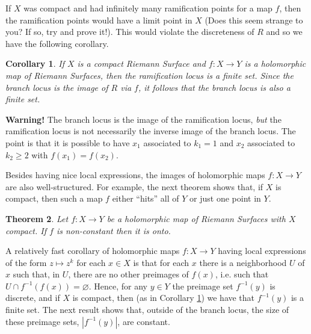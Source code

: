 \documentclass[12pt]{book}%
\theoremstyle{plain}
\newtheorem{theorem}{Theorem}[section]
\newtheorem{corollary}[theorem]{Corollary}
\theoremstyle{definition}
\theoremstyle{remark}
\def\to{\rightarrow}
\begin{document}
If $X$ was compact and had infinitely many ramification points for a map $f$, then the ramification points would have a limit point in $X$ (Does this seem strange to you? If so, try and prove it!). This would violate the discreteness of $R$ and so we have the following corollary. 
 
\begin{corollary}
\label{finiteRamification}
If $X$ is a compact Riemann Surface and $f:X \to Y$ is a holomorphic map of Riemann Surfaces, then the ramification locus is a finite set. Since the branch locus is the image of $R$ via $f$, it follows that the branch locus is also a finite set.
\end{corollary}

\noindent\textbf{Warning!} The branch locus is the image of the ramification locus, \textit{but} the ramification locus is not necessarily the inverse image of the branch locus. The point is that it is possible to have $x_1$ associated to $k_1 = 1$ and $x_2$ associated to $k_2 \geq 2$ with $f(x_1) = f(x_2)$.


Besides having nice local expressions, the images of holomorphic maps $f:X \to Y$ are also well-structured. For example, the next theorem shows that, if $X$ is compact, then such a map $f$ either ``hits'' all of $Y$ or just one point in $Y$.

\begin{theorem}
Let $f:X \to Y$ be a holomorphic map of Riemann Surfaces with $X$ compact. If $f$ is non-constant then it is onto.
\end{theorem}

A relatively fast corollary of holomorphic maps $f:X \to Y$ having local expressions of the form $z \mapsto z^k$ for each $x \in X$ is that for each $x$ there is a neighborhood $U$ of $x$ such that, in $U$, there are no other preimages of $f(x)$, i.e. such that $U \cap f^{-1}(f(x))= \varnothing$. Hence, for any $y \in Y$ the preimage set $f^{-1}(y)$ is discrete, and if $X$ is compact, then (as in Corollary \ref{finiteRamification}) we have that $f^{-1}(y)$ is a finite set. The next result shows that, outside of the branch locus, the size of these preimage sets, $|f^{-1}(y)|$, are constant.
\end{document}
